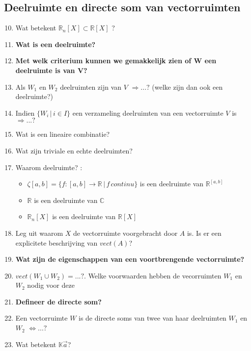 \documentclass[12pt]{article}
\begin{document}
    \subsection{Deelruimte en directe som van vectorruimten}
    \begin{enumerate}
        \setcounter{enumi}{9}
        \item Wat betekent $\mathbb{R}_n[X] \subset \mathbb{R}[X]$ ?
        \item \textbf{Wat is een deelruimte?}
        \item \textbf{Met welk criterium kunnen we gemakkelijk zien of W een deelruimte is van V?}
        \item Als $W_1$ en $W_2$ deelruimten zijn van $V$ $\Rightarrow ... ?$ (welke zijn dan ook een deelruimte?)
        \item Indien $\{ W_i \, | \, i \in I\}$ een verzameling deelruimten van een vectorruimte $V$ is $\Rightarrow ... ?$
        \item Wat is een lineaire combinatie?
        \item Wat zijn triviale en echte deelruimten?
        \item Waarom deelruimte? : \begin{itemize}
            \item $\zeta[a,b] = \{f:[a,b] \rightarrow \mathbb{R} \,|\, f \, continu\}$ is een deelruimte van $\mathbb{R}^{[a,b]}$
            \item $\mathbb{R}$ is een deelruimte van $\mathbb{C}$
            \item $\mathbb{R}_n[X]$ is een deelruimte van $\mathbb{R}[X]$
        \end{itemize}
        \item Leg uit waarom $X$ de vectorruimte voorgebracht door $A$ is. Is er een explicitete beschrijving van $vect(A)$?
        \item \textbf{Wat zijn de eigenschappen van een voortbrengende vectorruimte?}
        \item $vect(W_1 \cup W_2) = ...?$. Welke voorwaarden hebben de vecorruimten $W_1$ en $W_2$ nodig voor deze 
        \item \textbf{Defineer de directe som?}
        \item Een vectorruimte $W$ is de directe soms van twee van haar deelruimten $W_1$ en $W_2$ $\Leftrightarrow ...?$
        \item Wat betekent $\mathbb{K}\vec{a}$?
        
    \end{enumerate}
\end{document}
